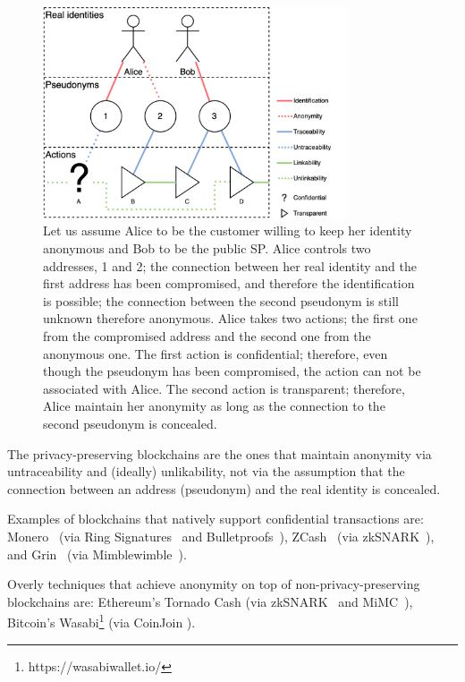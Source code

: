 \documentclass{ieeeaccess}
\begin{document}
\begin{figure}[h!]
\includegraphics[width=9cm]{anonymity-diagram.png}
\centering
\caption{Let us assume Alice to be the customer willing to keep her identity anonymous and Bob to be the public SP. Alice controls two addresses, 1 and 2; the connection between her real identity and the first address has been compromised, and therefore the identification is possible; the connection between the second pseudonym is still unknown therefore anonymous. Alice takes two actions; the first one from the compromised address and the second one from the anonymous one. The first action is confidential; therefore, even though the pseudonym has been compromised, the action can not be associated with Alice. The second action is transparent; therefore, Alice maintain her anonymity as long as the connection to the second pseudonym is concealed.}

\label{fig:anonymity-diagram}
\end{figure}

The privacy-preserving blockchains are the ones that maintain anonymity via untraceability and (ideally) unlikability, not via the assumption that the connection between an address (pseudonym) and the real identity is concealed.   

Examples of blockchains that natively support confidential transactions are: Monero~\cite{vansaberhagenCryptoNote2013} (via Ring Signatures~\cite{noetherRingSignatureConfidential2015} and Bulletproofs~\cite{moneroBulletproofsMoneropediaMonero, bunzBulletproofsShortProofs2018}), ZCash~\cite{ben-sassonZerocashDecentralizedAnonymous2014} (via zkSNARK~\cite{ben-sassonSNARKsVerifyingProgram2013}), and Grin~\cite{fuchsbauerAggregateCashSystems2019} (via Mimblewimble~\cite{jedusorMIMBLEWIMBLE2016}).

Overly techniques that achieve anonymity on top of non-privacy-preserving blockchains are: Ethereum's Tornado Cash\cite{pertsevTornadoCashPrivacy2019} (via zkSNARK~\cite{grothSizePairingbasedNoninteractive2016} and MiMC~\cite{albrechtMiMCEfficientEncryption2016}), Bitcoin's Wasabi\footnote{https://wasabiwallet.io/} (via CoinJoin \cite{maxwellCoinJoinBitcoinPrivacy2013}).
\end{document}
